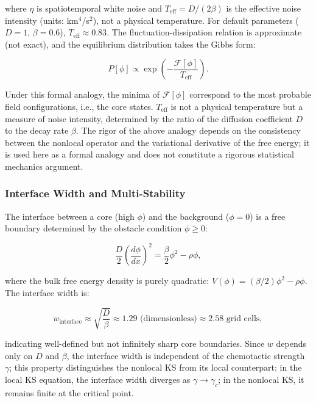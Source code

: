 \documentclass[sn-nature,pdflatex]{sn-jnl}
\begin{document}
where $\eta$ is spatiotemporal white noise and $T_{\text{eff}} = D/(2\beta)$ is the effective noise intensity (units: km$^4$/s$^2$), not a physical temperature. For default parameters ($D = 1$, $\beta = 0.6$), $T_{\text{eff}} \approx 0.83$.
The fluctuation-dissipation relation is approximate (not exact), and the equilibrium distribution takes the Gibbs form:

\begin{equation}
P[\phi] \propto \exp\left(-\frac{\mathcal{F}[\phi]}{T_{\text{eff}}}\right).
\end{equation}

Under this formal analogy, the minima of $\mathcal{F}[\phi]$ correspond to the most probable field configurations, i.e., the core states. $T_{\text{eff}}$ is not a physical temperature but a measure of noise intensity, determined by the ratio of the diffusion coefficient $D$ to the decay rate $\beta$. The rigor of the above analogy depends on the consistency between the nonlocal operator and the variational derivative of the free energy; it is used here as a formal analogy and does not constitute a rigorous statistical mechanics argument.

\subsubsection{Interface Width and Multi-Stability}

The interface between a core (high $\phi$) and the background ($\phi = 0$) is a free boundary determined by the obstacle condition $\phi \geq 0$:

\begin{equation}
\frac{D}{2}\left(\frac{d\phi}{dx}\right)^2 = \frac{\beta}{2}\phi^2 - \rho\phi,
\end{equation}

where the bulk free energy density is purely quadratic: $V(\phi) = (\beta/2)\phi^2 - \rho\phi$.
The interface width is:

\begin{equation}
w_{\text{interface}} \approx \sqrt{\frac{D}{\beta}} \approx 1.29 \text{ (dimensionless)} \approx 2.58 \text{ grid cells},
\end{equation}

indicating well-defined but not infinitely sharp core boundaries.
Since $w$ depends only on $D$ and $\beta$, the interface width is independent of the chemotactic strength $\gamma$; this property distinguishes the nonlocal KS from its local counterpart: in the local KS equation, the interface width diverges as $\gamma \to \gamma_c$; in the nonlocal KS, it remains finite at the critical point.
\end{document}
